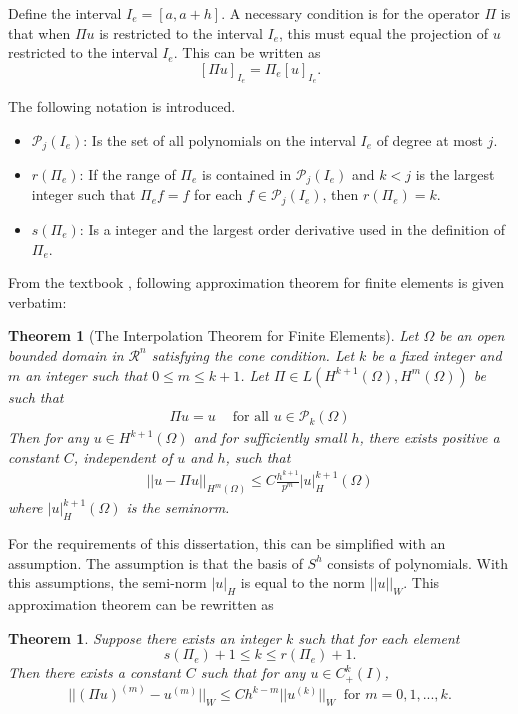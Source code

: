 \documentclass[../../main.tex]{subfiles}
\begin{document}
Define the interval $I_e = [a, a+h]$. A necessary condition is for the operator $\Pi$ is that when $\Pi u$ is restricted to the interval $I_e$, this must equal the projection of $u$ restricted to the interval $I_e$. This can be written as
\begin{equation*}
	\left[ \Pi u \right]_{I_{e}} = \Pi_e [u]_{I_{e}}.
\end{equation*}

The following notation is introduced.
\begin{itemize}
	\item[] $\mathcal{P}_j(I_e)$: Is the set of all polynomials on the interval $I_e$ of degree at most $j$. \label{sym:poly}
	\item[] $r(\Pi_e)$: If the range of $\Pi_e$ is contained in $\mathcal{P}_j(I_e)$ and $k<j$ is the largest integer such that $\Pi_e f = f$ for each $f \in \mathcal{P}_j(I_e)$, then $r(\Pi_e) = k$.
	\item[] $s(\Pi_e)$: Is a integer and the largest order derivative used in the definition of $\Pi_e$.
\end{itemize}

From the textbook \cite{OR76}, following approximation theorem for finite elements is given verbatim:
\newtheorem*{Interpolation}{Theorem}
\begin{Interpolation}[The Interpolation Theorem for Finite Elements] 
	Let $\Omega$ be an open bounded domain in $\mathcal{R}^n$ satisfying the cone condition. Let $k$ be a fixed integer and $m$ an integer such that $0\leq m \leq k+1$. Let $\Pi \in L(H^{k+1}(\Omega), H^{m}(\Omega))$ be such that
	\begin{eqnarray}
	    \Pi u = u \ \ \ \ \textrm{ for all } u \in \mathcal{P}_k(\Omega)
	\end{eqnarray}
	Then for any $u \in H^{k+1}(\Omega)$ and for sufficiently small $h$, there exists positive a constant $C$, independent of $u$ and $h$, such that
	\begin{eqnarray}
	    ||u - \Pi u||_{H^m(\Omega)} \leq C \frac{h^{k+1}}{p^m} |u|_H^{k+1}(\Omega)
	\end{eqnarray}
	where $|u|_H^{k+1}(\Omega)$ is the seminorm.
\end{Interpolation}

For the requirements of this dissertation, this can be simplified with an assumption. The assumption is that the basis of $S^h$ consists of polynomials. With this assumptions, the semi-norm $|u|_H$ is equal to the norm $||u||_{W}$. This approximation theorem can be rewritten as
\newtheorem{Interpolation_2}{Theorem}
\begin{Interpolation_2}
	Suppose there exists an integer $k$ such that for each element
	\begin{equation*}
		s(\Pi_e) + 1 \leq k \leq r(\Pi_e) +1.
	\end{equation*}
	Then there exists a constant $C$ such that for any $u \in C^k_+(I)$,
	\begin{equation*}
		||(\Pi u)^{(m)} - u^{(m)}||_{W} \leq C h^{k-m} || u^{(k)}||_{W} \ \text{ for } m = 0,1,...,k.
	\end{equation*}
\end{Interpolation_2}
\end{document}
